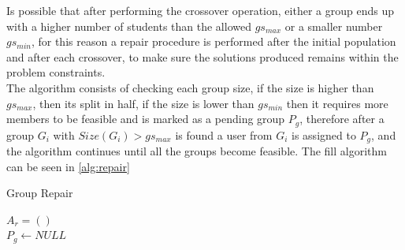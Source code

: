 Is possible that after performing the crossover operation, either a group ends up with a higher number of students than the allowed $gs_{max}$ or a smaller number $gs_{min}$, for this reason a repair procedure is performed after the initial population and after each crossover, to make sure the solutions produced remains within the problem constraints.\\

The algorithm consists of checking each group size, if the size is higher than $gs_{max}$, then its split in half, if the size is lower than $gs_{min}$ then it requires more members to be feasible and is marked as a pending group $P_g$, therefore after a group $G_i$ with $Size(G_i) > gs_{max}$ is found a user from $G_i$ is assigned to $P_g$, and the algorithm continues until all the groups become feasible.
The fill algorithm can be seen in \ref{alg:repair}

\begin{algorithm}[H]
    \caption{Group Repair}
    \label{alg:repair}
    \SetAlgoLined 
    $A_r = ()$\;\\
    $P_g \leftarrow NULL$\;\\
\end{algorithm}